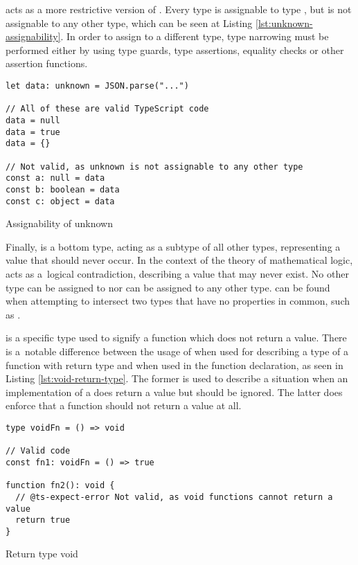  acts as a more restrictive version of . Every type is assignable to type , but  is not assignable to any other type, which can be seen at Listing \ref{lst:unknown-assignability}. In order to assign  to a different type, type narrowing must be performed either by using type guards, type assertions, equality checks or other assertion functions.

\clearpage

\begin{listing}[ht]
  \begin{verbatim}
let data: unknown = JSON.parse("...") 

// All of these are valid TypeScript code
data = null
data = true
data = {}

// Not valid, as unknown is not assignable to any other type
const a: null = data
const b: boolean = data
const c: object = data
  \end{verbatim}
  \caption{Assignability of unknown}\label{lst:unknown-assignability}
\end{listing}

Finally,  is a bottom type, acting as a subtype of all other types, representing a value that should never occur. In the context of the theory of mathematical logic,  acts as a~logical contradiction, describing a value that may never exist. No other type can be assigned to  nor  can be assigned to any other type.  can be found when attempting to intersect two types that have no properties in common, such as .

 is a specific type used to signify a function which does not return a value. There is a~notable difference between the usage of  when used for describing a type of a function with  return type and when used in the function declaration, as seen in Listing \ref{lst:void-return-type}. The former is used to describe a situation when an implementation of a  does return a value but should be ignored. The latter does enforce that a function should not return a value at all.

\begin{listing}[ht]
  \begin{verbatim}
type voidFn = () => void

// Valid code
const fn1: voidFn = () => true

function fn2(): void {
  // @ts-expect-error Not valid, as void functions cannot return a value
  return true
}
\end{verbatim}
  \caption{Return type void}\label{lst:void-return-type}
\end{listing}

